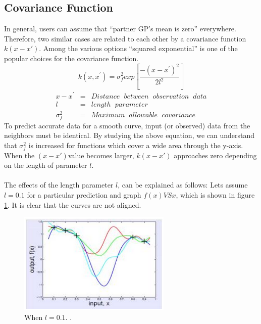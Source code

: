 \subsection{Covariance Function}
In general, users can assume that “partner GP’s mean is zero” everywhere\cite{simple-covariance}. Therefore, two similar cases are related to each other by a covariance function $ k(x-x') $. Among the various options “squared exponential” is one of the popular choices for the covariance function.
\begin{equation}
k(x,x^{'})=\sigma_{f}^{2}exp\left[ \dfrac{-(x-x^{'})^{2}}{2l^{2}} \right]
\label{eq:simple-covariance}
\end{equation}
\begin{eqnarray}
 x - x^{'} &=& Distance\hspace{7pt} between\hspace{7pt} observation\hspace{7pt} data    \nonumber \\
  l &=& length\hspace{7pt} parameter \nonumber \\
  \sigma_{f}^{2} &=& Maximum\hspace{7pt} allowable\hspace{7pt} covariance
\end{eqnarray}
To predict accurate data for a smooth curve, input (or observed) data from the neighbors must be identical. By studying the above equation, we can understand that $ \sigma_{f}^{2} $ is increased for functions which cover a wide area through the y-axis. When the $ (x-x') $value becomes larger, $k(x-x')$ approaches zero depending on the length of parameter $ l $.
\\\\
The effects of the length parameter $l$, can be explained as follows: Lets assume $l=0.1$ for a particular prediction and graph  $f(x)VS x$, which is shown in figure \ref{fig:length-parameter}. It is clear that the curves are not aligned\cite{intro-to-gpr}.
\begin{figure}[here]
  \centering
      \includegraphics[width=0.65\textwidth]{theory/graphics/effects-of-l.png}
  \caption{When $l = 0.1$. \cite{length-parameter}. }
  \label{fig:length-parameter}
\end{figure}
